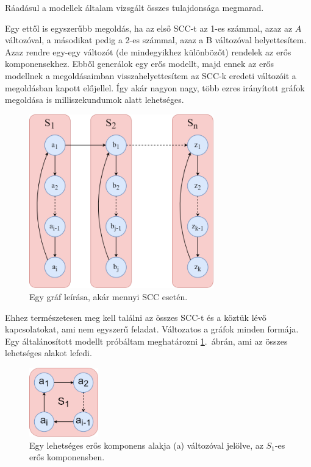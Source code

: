 \documentclass[
]{thesis-ekf}
\theoremstyle{definition}
\theoremstyle{remark}
\begin{document}
	Ráadásul a modellek általam vizsgált összes tulajdonsága megmarad.
	
	Egy ettől is egyszerűbb megoldás, ha az első \textsc{SCC}-t az 1-es számmal, azaz az $ A $ változóval, a másodikat pedig a 2-es számmal, azaz a B változóval helyettesítem. Azaz rendre egy-egy változót (de mindegyikhez különbözőt) rendelek az erős komponensekhez. Ebből generálok egy erős modellt, majd ennek az erős modellnek a megoldásaimban visszahelyettesítem az \textsc{SCC}-k eredeti változóit a megoldásban kapott előjellel. Így akár nagyon nagy, több ezres irányított gráfok megoldása is milliszekundumok alatt lehetséges.
	
	\begin{figure}[h]
		\centering
		\includegraphics[width=8cm]{images/sajat_pelda-altalanos}
		\caption{Egy gráf leírása, akár mennyi \textsc{SCC} esetén.}
		\label{abra-sajatpelda-altalanos}
	\end{figure}
	
	Ehhez természetesen meg kell találni az összes \textsc{SCC}-t és a köztük lévő kapcsolatokat, ami nem egyszerű feladat. Változatos a gráfok minden formája. Egy általánosított modellt próbáltam meghatározni \ref{abra-sajatpelda-altalanos}.~ábrán, ami az összes lehetséges alakot lefedi.
	
	\begin{figure}[h]
		\centering
		\includegraphics[width=3cm]{images/sajat_pelda-altalanos_scck_a}
		\caption{Egy lehetséges erős komponens alakja (a) változóval jelölve, az $ S_1 $-es erős komponensben.}
		\label{abra-sajatpelda-altalanos_scck_a-verzio}
	\end{figure}
	
\end{document}
